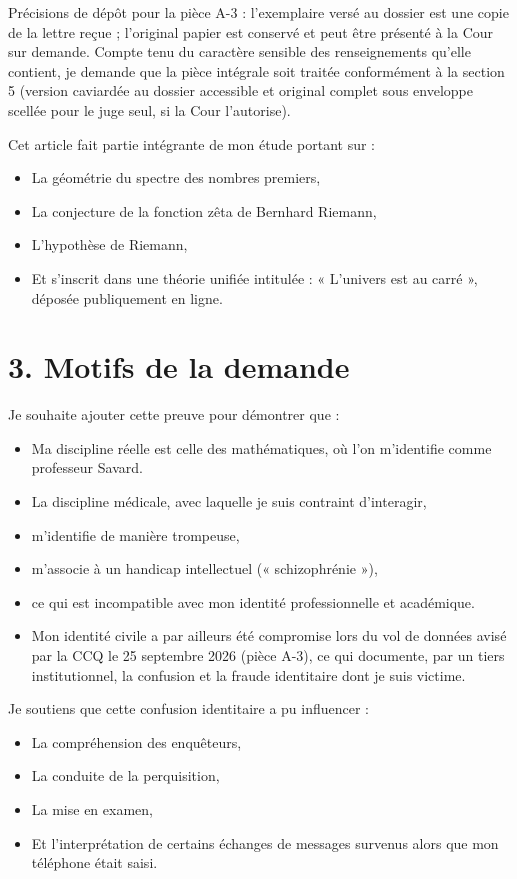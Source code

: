 \documentclass[12pt,a4paper]{article}
\begin{document}
Précisions de dépôt pour la pièce A-3 : l’exemplaire versé au dossier est une copie de la lettre reçue ; l’original papier est conservé et peut être présenté à la Cour sur demande. Compte tenu du caractère sensible des renseignements qu’elle contient, je demande que la pièce intégrale soit traitée conformément à la section 5 (version caviardée au dossier accessible et original complet sous enveloppe scellée pour le juge seul, si la Cour l’autorise).

Cet article fait partie intégrante de mon étude portant sur :

\begin{itemize}
  \item La géométrie du spectre des nombres premiers,
  \item La conjecture de la fonction zêta de Bernhard Riemann,
  \item L’hypothèse de Riemann,
  \item Et s’inscrit dans une théorie unifiée intitulée : « L’univers est au carré », déposée publiquement en ligne.
\end{itemize}

\section*{3. Motifs de la demande}
Je souhaite ajouter cette preuve pour démontrer que :

\begin{itemize}
  \item Ma discipline réelle est celle des mathématiques, où l’on m’identifie comme professeur Savard.
  \item La discipline médicale, avec laquelle je suis contraint d’interagir,
  \item m’identifie de manière trompeuse,
  \item m’associe à un handicap intellectuel (« schizophrénie »),
  \item ce qui est incompatible avec mon identité professionnelle et académique.
  \item Mon identité civile a par ailleurs été compromise lors du vol de données avisé par la CCQ le 25 septembre 2026 (pièce A-3), ce qui documente, par un tiers institutionnel, la confusion et la fraude identitaire dont je suis victime.
\end{itemize}

Je soutiens que cette confusion identitaire a pu influencer :

\begin{itemize}
  \item La compréhension des enquêteurs,
  \item La conduite de la perquisition,
  \item La mise en examen,
  \item Et l’interprétation de certains échanges de messages survenus alors que mon téléphone était saisi.
\end{itemize}
\end{document}
